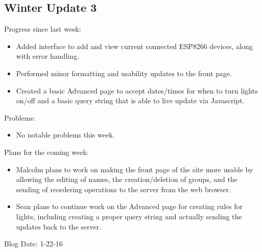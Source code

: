 \subsection{Winter Update 3}
Progress since last week:
\begin{itemize}
   \item Added interface to add and view current connected ESP8266 devices, along with error handling.
   \item Performed minor formatting and usability updates to the front page.
   \item Created a basic Advanced page to accept dates/times for when to turn lights on/off and a basic query string that is able to live update via Javascript.
\end{itemize}
Problems:
\begin{itemize}
   \item No notable problems this week.
\end{itemize}
Plans for the coming week:
\begin{itemize}
   \item Malcolm plans to work on making the front page of the site more usable by allowing the editing of names, the creation/deletion of groups, and the sending of reordering operations to the server from the web browser.
   \item Sean plans to continue work on the Advanced page for creating rules for lights, including creating a proper query string and actually sending the updates back to the server.
\end{itemize}
Blog Date: 1-22-16

